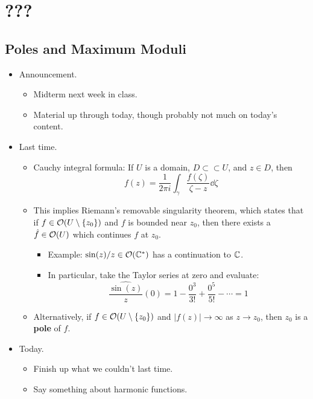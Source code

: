 \documentclass[../notes.tex]{subfiles}
\begin{document}
\chapter{???}
\section{Poles and Maximum Moduli}
\begin{itemize}
    \item {}Announcement.
    \begin{itemize}
        \item Midterm next week in class.
        \item Material up through today, though probably not much on today's content.
    \end{itemize}
    \item Last time.
    \begin{itemize}
        \item Cauchy integral formula: If $U$ is a domain, $D\subset\subset U$, and $z\in D$, then
        \begin{equation*}
            f(z) = \frac{1}{2\pi i}\int_\gamma\frac{f(\zeta)}{\zeta-z}\dd{\zeta}
        \end{equation*}
        \item This implies Riemann's removable singularity theorem, which states that if $f\in\mathcal{O}(U\setminus\{z_0\})$ and $f$ is bounded near $z_0$, then there exists a $\hat{f}\in\mathcal{O}(U)$ which continues $f$ at $z_0$.
        \begin{itemize}
            \item Example: $\sin(z)/z\in\mathcal{O}(\mathbb{C}^*)$ has a continuation to $\mathbb{C}$.
            \item In particular, take the Taylor series at zero and evaluate:
            \begin{equation*}
                \widehat{\frac{\sin(z)}{z}}(0) = 1-\frac{0^3}{3!}+\frac{0^5}{5!}-\cdots = 1
            \end{equation*}
        \end{itemize}
        \item Alternatively, if $f\in\mathcal{O}(U\setminus\{z_0\})$ and $|f(z)|\to\infty$ as $z\to z_0$, then $z_0$ is a \textbf{pole} of $f$.
    \end{itemize}
    \item Today.
    \begin{itemize}
        \item Finish up what we couldn't last time.
        \item Say something about harmonic functions.

\end{itemize}
\end{itemize}
\end{document}

